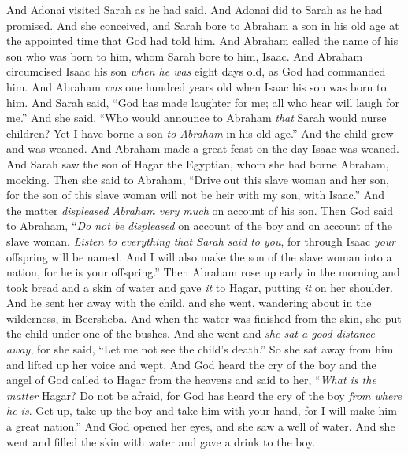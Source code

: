 \begin{biblechapter} %
 And Adonai visited Sarah as he had said. And Adonai did to Sarah as he had promised.
\verse And she conceived, and Sarah bore to Abraham a son in his old age at the appointed time that God had told him.
\verse And Abraham called the name of his son who was born to him, whom Sarah bore to him, Isaac.
\verse And Abraham circumcised Isaac his son \textit{when he was} eight days old, as God had commanded him.
\verse And Abraham \textit{was} one hundred years old when Isaac his son was born to him.
\verse And Sarah said, “God has made laughter for me; all who hear will laugh for me.”
\verse And she said, “Who would announce to Abraham \textit{that} Sarah would nurse children? Yet I have borne a son \textit{to Abraham} in his old age.”
 And the child grew and was weaned. And Abraham made a great feast on the day Isaac was weaned.
\verse And Sarah saw the son of Hagar the Egyptian, whom she had borne Abraham, mocking.
\verse Then she said to Abraham, “Drive out this slave woman and her son, for the son of this slave woman will not be heir with my son, with Isaac.”
\verse And the matter \textit{displeased Abraham very much} on account of his son.
\verse Then God said to Abraham, “\textit{Do not be displeased} on account of the boy and on account of the slave woman. \textit{Listen to everything that Sarah said to you}, for through Isaac \textit{your} offspring will be named.
\verse And I will also make the son of the slave woman into a nation, for he is your offspring.”
\verse Then Abraham rose up early in the morning and took bread and a skin of water and gave \textit{it} to Hagar, putting \textit{it} on her shoulder. And he sent her away with the child, and she went, wandering about in the wilderness, in Beersheba.
\verse And when the water was finished from the skin, she put the child under one of the bushes.
\verse And she went and \textit{she sat a good distance away}, for she said, “Let me not see the child’s death.” So she sat away from him and lifted up her voice and wept.
\verse And God heard the cry of the boy and the angel of God called to Hagar from the heavens and said to her, “\textit{What is the matter} Hagar? Do not be afraid, for God has heard the cry of the boy \textit{from where he is}.
\verse Get up, take up the boy and take him with your hand, for I will make him a great nation.”
\verse And God opened her eyes, and she saw a well of water. And she went and filled the skin with water and gave a drink to the boy.

\end{biblechapter}
